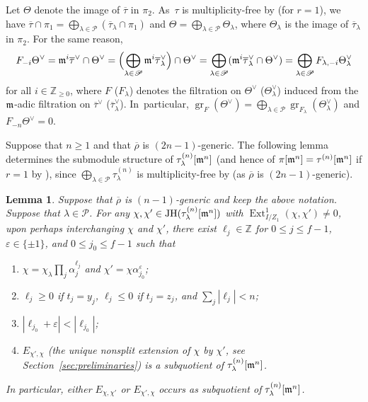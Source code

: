 \documentclass[JEP,XML,SOM,Unicode,NoFloatCountersInSection, NoEqCountersInSection,published]{cedram}
\let\ovl\overline
\newcommand{\Z}{{\mathbb Z}}
\renewcommand{\P}{\mathscr P}
\newcommand{\brho}{\overline{\rho}}
\DeclareMathOperator{\Ext}{Ext}
\DeclareMathOperator{\gr}{gr}
\DeclareMathOperator{\JH}{\mathrm{JH}}
\let\ve\varepsilon
\theoremstyle{plain}
\newtheorem{lem}[prop]{Lemma}
\theoremstyle{definition}
\begin{document}
Let $\Theta$ denote the image of $\ovl\tau$ in $\pi_2$. As~$\tau$ is multiplicity-free by \cite[Cor.\,2.4.3(i)]{BHHMS4} (for $r=1$),
we have $\ovl\tau \cap \pi_1 = \bigoplus_{\lambda \in \P} (\ovl\tau_\lambda \cap \pi_1)$ and $\Theta = \bigoplus_{\lambda \in \P} \Theta_\lambda$, where $\Theta_\lambda$ is the image of $\ovl\tau_\lambda$ in $\pi_2$.
For the same reason,\vspace*{-3pt}
\begin{equation}\label{eq:filtrations}
F_{-i} \Theta^\vee = \m^i \ovl\tau^\vee \cap \Theta^\vee = \Bigl(\bigoplus_{\lambda \in \P} \m^i \ovl\tau_\lambda^\vee\Bigr) \cap \Theta^\vee = \bigoplus_{\lambda \in \P} (\m^i \ovl\tau_\lambda^\vee \cap \Theta^\vee) = \bigoplus_{\lambda \in \P} F_{\lambda,-i} \Theta_\lambda^\vee
\end{equation}
for all $i \in \Z_{\ge 0}$, where $F$ (\resp $F_\lambda$) denotes the filtration on $\Theta^\vee$ (\resp $\Theta_\lambda^\vee$) induced from the $\mathfrak{m}$-adic filtration on $\ovl\tau^\vee$ (\resp $\ovl\tau_\lambda^\vee$). In~particular, $\gr_F(\Theta^\vee) = \bigoplus_{\lambda \in \P} \gr_{F_\lambda}(\Theta_\lambda^\vee)$ and $F_{-n} \Theta^\vee = 0$.

Suppose that $n \ge 1$ and that $\brho$ is {$(2n-1)$}-generic.
The following lemma determines the submodule structure of $\tau_\lambda^{(n)}[\mathfrak{m}^n]$ (and hence of $\pi[\mathfrak{m}^n] = \tau^{(n)}[\mathfrak{m}^n]$ if $r=1$ by \cite[Cor.\,2.4.3(ii)]{BHHMS4}), since $\bigoplus_{\lambda\in\mathscr{P}}\tau_{\lambda}^{(n)}$ is multiplicity-free by \cite[Cor.\,2.4.3(i)]{BHHMS4} (as $\brho$ is {$(2n-1)$}-generic).

\begin{lem}\label{lem:submodule-structure}
Suppose that $\brho$ is {$(n-1)$-generic}
and keep the above notation.
Suppose that $\lambda \in \P$.
For any $\chi,\chi' \in \JH(\tau^{(n)}_\lambda[\m^n])$ with $\Ext^1_{I/Z_1}(\chi,\chi') \ne 0$, upon perhaps interchanging $\chi$ and $\chi'$, there exist $\ell_j \in \Z$ for $0 \le j \le f-1$, $\ve \in \{\pm1\}$, and $0 \le j_0 \le f-1$ such that
\begin{enumerate}
\item\label{lem:submodule-structurei} $\chi = \chi_\lambda \prod_j \alpha_j^{\ell_j}$ and $\chi' = \chi \alpha_{j_0}^{\ve}$;
\item\label{lem:submodule-structureii} $\ell_j \ge 0$ if $t_j = y_j$, $\ell_j \le 0$ if $t_j = z_j$, and $\sum_j |\ell_j| < n$;
\item\label{lem:submodule-structureiii} $|\ell_{j_0}+\ve| < |\ell_{j_0}|$;
\item\label{lem:submodule-structureiv} $E_{\chi',\chi}$ (the unique nonsplit extension of $\chi$ by $\chi'$, see Section~\ref{sec:preliminaries}) is a subquotient of $\tau^{(n)}_\lambda[\mathfrak{m}^n]$.
\end{enumerate}
In particular, either $E_{\chi,\chi'}$ or $E_{\chi',\chi}$ occurs as subquotient of $\tau^{(n)}_\lambda[\mathfrak{m}^n]$.
\end{lem}
\end{document}
